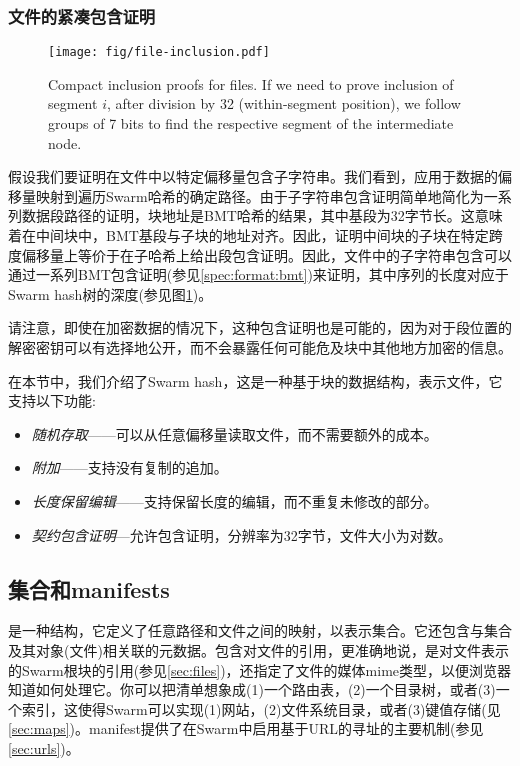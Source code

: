 \subsubsection{文件的紧凑包含证明}


\begin{figure}[htbp]
\centering
\texttt{[image: fig/file-inclusion.pdf]}
\caption[Compact inclusion proofs for files \statusgreen]{Compact inclusion proofs for files. If we need to prove inclusion of segment   $i$, after division by 32 (within-segment position), we follow groups of 7 bits to find the respective segment of the intermediate node.}
\label{fig:file-inclusion}
\end{figure}


假设我们要证明在文件中以特定偏移量包含子字符串。我们看到，应用于数据的偏移量映射到遍历Swarm哈希的确定路径。由于子字符串包含证明简单地简化为一系列数据段路径的证明，块地址是BMT哈希的结果，其中基段为32字节长。这意味着在中间块中，BMT基段与子块的地址对齐。因此，证明中间块的子块在特定跨度偏移量上等价于在子哈希上给出段包含证明。因此，文件中的子字符串包含可以通过一系列BMT包含证明(参见\ref{spec:format:bmt})来证明，其中序列的长度对应于Swarm hash树的深度(参见图\ref{fig:file-inclusion})。 


请注意，即使在加密数据的情况下，这种包含证明也是可能的，因为对于段位置的解密密钥可以有选择地公开，而不会暴露任何可能危及块中其他地方加密的信息。

在本节中，我们介绍了Swarm hash，这是一种基于块的数据结构，表示文件，它支持以下功能:

\begin{itemize}
    \item \emph{随机存取}——可以从任意偏移量读取文件，而不需要额外的成本。
    \item \emph{附加}——支持没有复制的追加。 
    \item \emph{长度保留编辑}——支持保留长度的编辑，而不重复未修改的部分。
    \item \emph{契约包含证明}—允许包含证明，分辨率为32字节，文件大小为对数。
\end{itemize}



\subsection{集合和manifests\statusgreen}\label{sec:collections}

是一种结构，它定义了任意路径和文件之间的映射，以表示集合。它还包含与集合及其对象(文件)相关联的元数据。包含对文件的引用，更准确地说，是对文件表示的Swarm根块的引用(参见\ref{sec:files})，还指定了文件的媒体mime类型，以便浏览器知道如何处理它。你可以把清单想象成(1)一个路由表，(2)一个目录树，或者(3)一个索引，这使得Swarm可以实现(1)网站，(2)文件系统目录，或者(3)键值存储(见\ref{sec:maps})。manifest提供了在Swarm中启用基于URL的寻址的主要机制(参见\ref{sec:urls})。 

